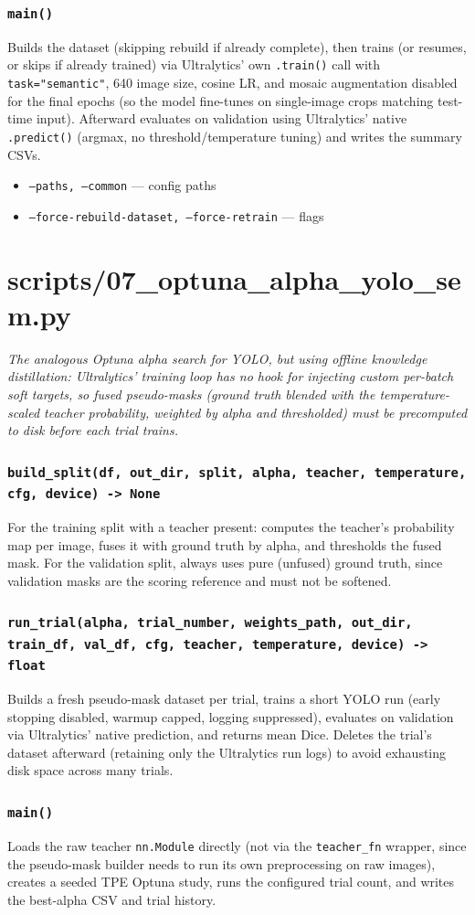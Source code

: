 \documentclass[11pt]{article}
\newcommand{\role}[1]{\par\noindent\textit{#1}\par\vspace{0.5em}}
\newcommand{\func}[1]{\subsubsection*{\texttt{#1}}}
\newcommand{\cliarg}[2]{\item \texttt{#1} --- #2}
\begin{document}
\func{main()}
Builds the dataset (skipping rebuild if already complete), then trains (or
resumes, or skips if already trained) via Ultralytics' own \texttt{.train()}
call with \texttt{task="semantic"}, 640 image size, cosine LR, and mosaic
augmentation disabled for the final epochs (so the model fine-tunes on
single-image crops matching test-time input). Afterward evaluates on
validation using Ultralytics' native \texttt{.predict()} (argmax, no
threshold/temperature tuning) and writes the summary CSVs.

\begin{itemize}[nosep]
\cliarg{--paths, --common}{config paths}
\cliarg{--force-rebuild-dataset, --force-retrain}{flags}
\end{itemize}

\section{scripts/07\_optuna\_alpha\_yolo\_sem.py}
\role{The analogous Optuna alpha search for YOLO, but using \emph{offline}
knowledge distillation: Ultralytics' training loop has no hook for injecting
custom per-batch soft targets, so fused pseudo-masks (ground truth blended with
the temperature-scaled teacher probability, weighted by alpha and thresholded)
must be precomputed to disk before each trial trains.}

\func{build\_split(df, out\_dir, split, alpha, teacher, temperature, cfg, device) -> None}
For the training split with a teacher present: computes the teacher's
probability map per image, fuses it with ground truth by alpha, and thresholds
the fused mask. For the validation split, always uses pure (unfused) ground
truth, since validation masks are the scoring reference and must not be
softened.

\func{run\_trial(alpha, trial\_number, weights\_path, out\_dir, train\_df, val\_df, cfg, teacher, temperature, device) -> float}
Builds a fresh pseudo-mask dataset per trial, trains a short YOLO run (early
stopping disabled, warmup capped, logging suppressed), evaluates on validation
via Ultralytics' native prediction, and returns mean Dice. Deletes the trial's
dataset afterward (retaining only the Ultralytics run logs) to avoid exhausting
disk space across many trials.

\func{main()}
Loads the raw teacher \texttt{nn.Module} directly (not via the
\texttt{teacher\_fn} wrapper, since the pseudo-mask builder needs to run its own
preprocessing on raw images), creates a seeded TPE Optuna study, runs the
configured trial count, and writes the best-alpha CSV and trial history.
\end{document}
